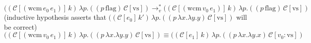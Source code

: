 \documentclass[ms,electronic,twosidetoc,letterpaper,chaptercenter,parttop]{byumsphd}
\begin{document}
\[
((\mathcal{C}[(\mathrm{wcm}\,e_0\,e_1)]\,k)\,\lambda p.((p\,\mathrm{flag})\,\mathcal{C}[\mathrm{vs}])\rightarrow_{v}^{*}((\mathcal{C}[(\mathrm{wcm}\,v_0\,e_1)]\,k)\,\lambda p.((p\,\mathrm{flag})\,\mathcal{C}[\mathrm{vs}])
\]
(inductive hypothesis asserts that $((\mathcal{C}[e_0]\,k')\,\lambda p.((p\,\lambda x.\lambda y.y)\,\mathcal{C}[\mathrm{vs}])$ will be correct)
\[
((\mathcal{C}[(\mathrm{wcm}\,v_0\,e_1)]\,k)\,\lambda p.((p\,\lambda x.\lambda y.y)\,\mathcal{C}[\mathrm{vs}])\equiv((\mathcal{C}[e_1]\,k)\,\lambda p.((p\,\lambda x.\lambda y.x)\,\mathcal{C}[v_0 : \mathrm{vs}])
\]










\end{document}

